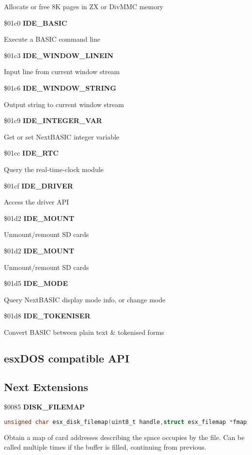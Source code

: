 Allocate or free 8K pages in ZX or DivMMC memory

\$01c0 \textbf{IDE\_BASIC}

Execute a BASIC command line

\$01c3 \textbf{IDE\_WINDOW\_LINEIN}

Input line from current window stream

\$01c6 \textbf{IDE\_WINDOW\_STRING}

Output string to current window stream

\$01c9 \textbf{IDE\_INTEGER\_VAR}

Get or set NextBASIC integer variable

\$01cc \textbf{IDE\_RTC}

Query the real-time-clock module

\$01cf \textbf{IDE\_DRIVER}

Access the driver API

\$01d2 \textbf{IDE\_MOUNT}

Unmount/remount SD cards

\$01d2 \textbf{IDE\_MOUNT}

Unmount/remount SD cards

\$01d5 \textbf{IDE\_MODE}

Query NextBASIC display mode info, or change mode

\$01d8 \textbf{IDE\_TOKENISER}

Convert BASIC between plain text \& tokenised forms


\subsection{esxDOS compatible API}

\subsection{Next Extensions}

\$0085 \textbf{DISK\_FILEMAP}

\begin{lstlisting}[language=C]
unsigned char esx_disk_filemap(uint8_t handle,struct esx_filemap *fmap)
\end{lstlisting}

Obtain a map of card addresses describing the space occupies by the
file. Can be called multiple times if the buffer is filled, continuing
from previous.

